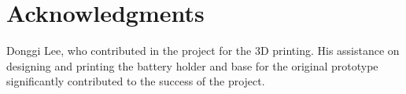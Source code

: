\documentclass[11pt,journal]{IEEEtran}
\begin{document}
\section*{Acknowledgments}

  Donggi Lee, who contributed in the project for the 3D printing. His assistance on designing and printing the battery holder and base for the original prototype significantly contributed to the success of the project.



\end{document}
